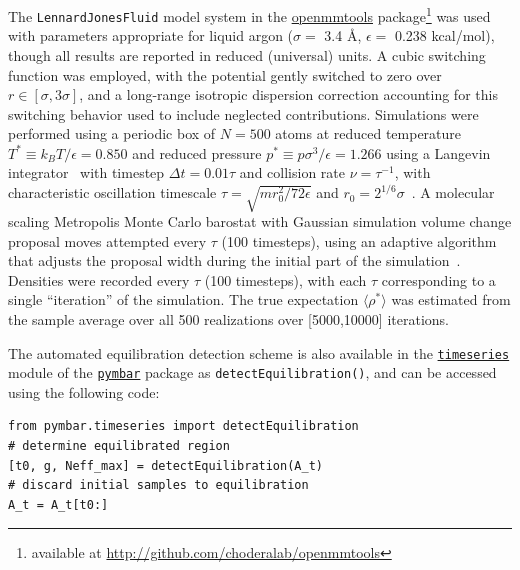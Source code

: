 \documentclass[aps,pre,twocolumn,nofootinbib,superscriptaddress,linenumbers,11point]{revtex4-1}
\newcommand{\expect}[1]{\langle #1 \rangle}                %
\begin{document}
The {\tt LennardJonesFluid} model system in the \href{http://github.com/choderalab/openmmtools}{openmmtools} package\footnote{available at \url{http://github.com/choderalab/openmmtools}} was used with parameters appropriate for liquid argon ($\sigma = $ 3.4 \AA, $\epsilon = $ 0.238 kcal/mol), though all results are reported in reduced (universal) units.
A cubic switching function was employed, with the potential gently switched to zero over $r \in [\sigma, 3 \sigma]$, and a long-range isotropic dispersion correction accounting for this switching behavior used to include neglected contributions.
Simulations were performed using a periodic box of $N = 500$ atoms at reduced temperature $T^* \equiv k_B T / \epsilon = 0.850$ and reduced pressure $p^* \equiv p \sigma^3 / \epsilon = 1.266$ using a Langevin integrator~\cite{sivak-chodera-crooks:jpcb:2014:vvvr} with timestep $\Delta t = 0.01 \tau$ and collision rate $\nu = \tau^{-1}$, with characteristic oscillation timescale $\tau = \sqrt{m r_0^2 / 72 \epsilon}$ and $r_0 = 2^{1/6} \sigma$~\cite{liquid-argon-characteristic-timescale}.
A molecular scaling Metropolis Monte Carlo barostat with Gaussian simulation volume change proposal moves attempted every $\tau$ (100 timesteps), using an adaptive algorithm that adjusts the proposal width during the initial part of the simulation~\cite{eastman:jctc:2012:openmm}.
Densities were recorded every $\tau$ (100 timesteps), with each $\tau$ corresponding to a single ``iteration'' of the simulation.
The true expectation $\expect{ \rho^* }$ was estimated from the sample average over all 500 realizations over [5000,10000] iterations.

The automated equilibration detection scheme is also available in the \href{http://pymbar.readthedocs.org/en/latest/timeseries.html}{\tt timeseries} module of the \href{http://github.com/choderalab/pymbar}{\tt pymbar} package as {\tt detectEquilibration()}, and can be accessed using the following code:

\begin{verbatim}
from pymbar.timeseries import detectEquilibration
# determine equilibrated region
[t0, g, Neff_max] = detectEquilibration(A_t)
# discard initial samples to equilibration
A_t = A_t[t0:]
\end{verbatim}

\end{document}
